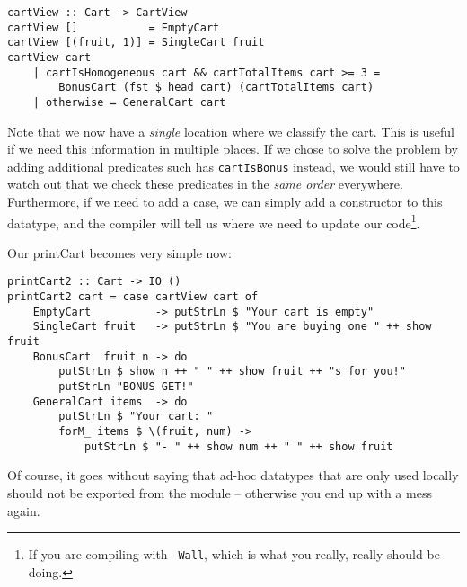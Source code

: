 \begin{verbatim}
cartView :: Cart -> CartView
cartView []           = EmptyCart
cartView [(fruit, 1)] = SingleCart fruit
cartView cart
    | cartIsHomogeneous cart && cartTotalItems cart >= 3 =
        BonusCart (fst $ head cart) (cartTotalItems cart)
    | otherwise = GeneralCart cart
\end{verbatim}
Note that we now have a \textit{single} location where we classify the cart. This is useful if we need this information in multiple places. If we chose to solve the problem by adding additional predicates such has \texttt{cartIsBonus} instead, we would still have to watch out that we check these predicates in the \textit{same order} everywhere. Furthermore, if we need to add a case, we can simply add a constructor to this datatype, and the compiler will tell us where we need to update our code\footnote{If you are compiling with \texttt{-Wall}, which is what you really, really should be doing.}.

Our printCart becomes very simple now:

\begin{verbatim}
printCart2 :: Cart -> IO ()
printCart2 cart = case cartView cart of
    EmptyCart          -> putStrLn $ "Your cart is empty"
    SingleCart fruit   -> putStrLn $ "You are buying one " ++ show fruit
    BonusCart  fruit n -> do
        putStrLn $ show n ++ " " ++ show fruit ++ "s for you!"
        putStrLn "BONUS GET!"
    GeneralCart items  -> do
        putStrLn $ "Your cart: "
        forM_ items $ \(fruit, num) ->
            putStrLn $ "- " ++ show num ++ " " ++ show fruit
\end{verbatim}
Of course, it goes without saying that ad-hoc datatypes that are only used locally should not be exported from the module -- otherwise you end up with a mess again.

